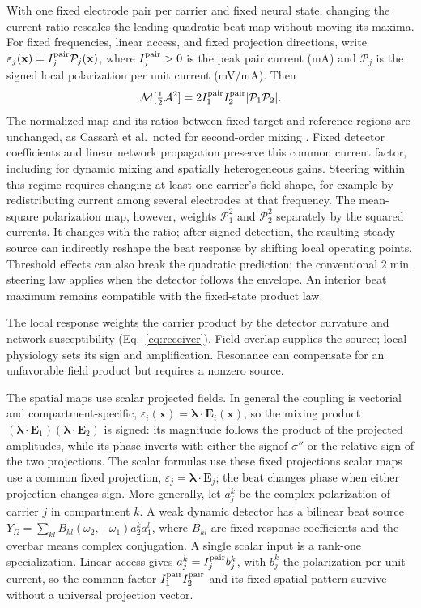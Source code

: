 \documentclass[11pt,a4paper]{article}
\newcommand{\Sig}{\sigma}
\providecommand{\DIFaddtex}[1]{{\protect\color{blue} \sf #1}} %
\providecommand{\DIFdeltex}[1]{{\protect\color{red} \scriptsize #1}} %
\providecommand{\DIFaddbegin}{} %
\providecommand{\DIFaddend}{} %
\providecommand{\DIFdelbegin}{} %
\providecommand{\DIFdelend}{} %
\providecommand{\DIFadd}[1]{\texorpdfstring{\DIFaddtex{#1}}{#1}} %
\providecommand{\DIFdel}[1]{\texorpdfstring{\DIFdeltex{#1}}{}} %
\begin{document}
With one fixed electrode pair per carrier and fixed neural state, changing the
current ratio rescales the leading quadratic beat map without moving its maxima.
For fixed frequencies,
linear access, and fixed projection directions, write
$\varepsilon_j(\mathbf x)=I_j^{\rm pair}\mathcal P_j(\mathbf x)$, where
$I_j^{\rm pair}>0$ is the peak pair current (mA) and $\mathcal P_j$ is the signed
local polarization per unit current (mV/mA). Then
\[
\mathcal M[\tfrac12\mathcal A^2]
=2I_1^{\rm pair}I_2^{\rm pair}|\mathcal P_1\mathcal P_2|.
\]
The normalized map and its ratios between fixed target and reference regions are unchanged, as
Cassar\`a et al.\ noted for second-order mixing \cite{cassara2025part2}.
Fixed detector coefficients and linear network propagation preserve this common
current factor, including for dynamic mixing and spatially heterogeneous gains.
Steering within this regime requires changing at least one carrier's field shape,
for example by redistributing current among several electrodes at that frequency.
The mean-square polarization map, however, weights $\mathcal P_1^2$ and
$\mathcal P_2^2$ separately by the squared currents. It changes with the ratio;
after signed detection, the resulting steady source can indirectly reshape the
beat response by shifting local operating points. Threshold effects can also
break the quadratic prediction; the conventional $2\min$ steering law applies
when the detector follows the envelope. An interior beat maximum remains
compatible with the fixed-state product law.

The local response weights the carrier product by the detector curvature and
network susceptibility (Eq.~\eqref{eq:receiver}). Field overlap supplies the
source; local physiology sets its sign and amplification. Resonance can compensate
for an unfavorable field product but requires a nonzero source.

The \DIFdelbegin \DIFdel{spatial maps use scalar projected fields. In general the
coupling is vectorial and compartment-specific,
$\varepsilon_i(\mathbf{x})=\boldsymbol{\lambda}\!\cdot\!\mathbf{E}_i(\mathbf{x})$, so the mixing product $(\boldsymbol{\lambda}\!\cdot\!\mathbf{E}_1)
(\boldsymbol{\lambda}\!\cdot\!\mathbf{E}_2)$ is signed: its magnitude follows the product
of the projected amplitudes, while its phase
inverts with either the signof $\Sig''$ or
the
relative sign of the two projections. The scalar formulas use these fixed projections}\DIFdelend \DIFaddbegin \DIFadd{scalar maps use a common fixed projection,
$\varepsilon_j=\boldsymbol\lambda\cdot\mathbf E_j$; the beat changes phase
when either projection changes sign. More generally, let $a_j^k$ be the
complex polarization of carrier $j$ in compartment $k$. A weak dynamic
detector has a bilinear beat source
$Y_\Omega=\sum_{kl}B_{kl}(\omega_2,-\omega_1)a_2^k\overline{a_1^l}$,
where $B_{kl}$ are fixed response coefficients and the overbar means complex
conjugation. A single scalar input is a rank-one specialization. Linear
access gives $a_j^k=I_j^{\rm pair}b_j^k$, with $b_j^k$ the polarization per
unit current, so the common factor $I_1^{\rm pair}I_2^{\rm pair}$ and its
fixed spatial pattern survive without a universal projection vector}\DIFaddend .
\end{document}
